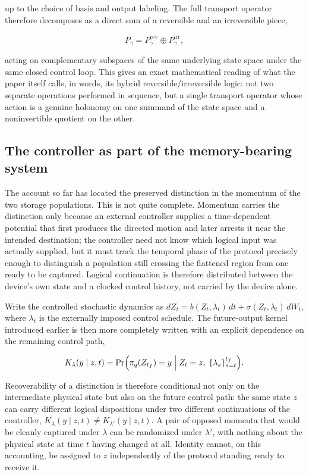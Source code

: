 \documentclass[11pt]{article}
\begin{document}
up to the choice of basis and output labeling. The full transport operator therefore decomposes as a direct sum of a reversible and an irreversible piece,

\[
P_\gamma = P_\gamma^{\mathrm{rev}} \oplus P_\gamma^{\mathrm{irr}},
\]

acting on complementary subspaces of the same underlying state space under the same closed control loop. This gives an exact mathematical reading of what the paper itself calls, in words, its hybrid reversible/irreversible logic: not two separate operations performed in sequence, but a single transport operator whose action is a genuine holonomy on one summand of the state space and a noninvertible quotient on the other.

\subsection{The controller as part of the memory-bearing system}

The account so far has located the preserved distinction in the momentum of the two storage populations. This is not quite complete. Momentum carries the distinction only because an external controller supplies a time-dependent potential that first produces the directed motion and later arrests it near the intended destination; the controller need not know which logical input was actually supplied, but it must track the temporal phase of the protocol precisely enough to distinguish a population still crossing the flattened region from one ready to be captured. Logical continuation is therefore distributed between the device's own state and a clocked control history, not carried by the device alone.

Write the controlled stochastic dynamics as $dZ_t = b(Z_t,\lambda_t)\,dt + \sigma(Z_t,\lambda_t)\,dW_t$, where $\lambda_t$ is the externally imposed control schedule. The future-output kernel introduced earlier is then more completely written with an explicit dependence on the remaining control path,

\[
K_\lambda(y\mid z,t) = \Pr\Bigl(\pi_q(Z_{t_f})=y \;\Big|\; Z_t=z,\; \{\lambda_s\}_{s=t}^{t_f}\Bigr).
\]

Recoverability of a distinction is therefore conditional not only on the intermediate physical state but also on the future control path: the same state $z$ can carry different logical dispositions under two different continuations of the controller, $K_\lambda(y\mid z,t)\neq K_{\lambda'}(y\mid z,t)$. A pair of opposed momenta that would be cleanly captured under $\lambda$ can be randomized under $\lambda'$, with nothing about the physical state at time $t$ having changed at all. Identity cannot, on this accounting, be assigned to $z$ independently of the protocol standing ready to receive it.
\end{document}
